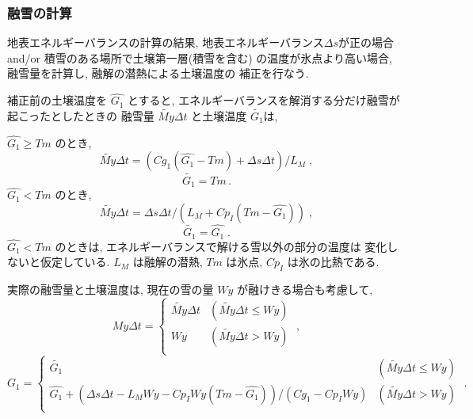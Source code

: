 \subsubsection{融雪の計算}

地表エネルギーバランスの計算の結果, 地表エネルギーバランス$\Delta s$が正の場合
 and/or 積雪のある場所で土壌第一層(積雪を含む)
の温度が氷点より高い場合, 融雪量を計算し, 融解の潜熱による土壌温度の
補正を行なう. 

補正前の土壌温度を $\hat{G_1}$ とすると, 
エネルギーバランスを解消する分だけ融雪が起こったとしたときの
融雪量 $\tilde{My} \Delta t$ と土壌温度 $\tilde{G_1}$は, 

$\hat{G_1} \ge Tm$ のとき, 
\begin{equation}
\tilde{My} \Delta t = ( Cg_1 ( \hat{G_1} - Tm ) + \Delta s \Delta t ) / L_M \; ,
\end{equation}
\begin{equation}
\tilde{G_1} = Tm \, .
\end{equation}
$\hat{G_1} < Tm$ のとき, 
\begin{equation}
\tilde{My} \Delta t = \Delta s \Delta t / ( L_M + Cp_I ( Tm - \hat{G_1} ) ) \; ,
\end{equation}
\begin{equation}
\tilde{G_1} = \hat{G_1} \; .
\end{equation}
$\hat{G_1} < Tm$ のときは, エネルギーバランスで解ける雪以外の部分の温度は
変化しないと仮定している. 
$L_M$ は融解の潜熱, $Tm$ は氷点, $Cp_I$ は氷の比熱である. 

実際の融雪量と土壌温度は, 現在の雪の量 $Wy$ が融けきる場合も考慮して, 
\begin{equation}
My \Delta t = \left\{
   \begin{array}{ll}
      \tilde{My} \Delta t & ( \tilde{My} \Delta t \le Wy ) \\
      Wy                  & ( \tilde{My} \Delta t >   Wy ) \\
   \end{array}
\right. \; ,
\end{equation}
\begin{equation}
G_1 = \left\{
   \begin{array}{ll}
      \tilde{G_1}  & ( \tilde{My} \Delta t \le Wy ) \\
      \hat{G_1} + ( \Delta s \Delta t - L_M Wy - Cp_I Wy ( Tm - \hat{G_1} ) )
                / ( Cg_1 - Cp_I Wy )
                   & ( \tilde{My} \Delta t >   Wy ) \\
   \end{array}
\right. \; .
\end{equation}

